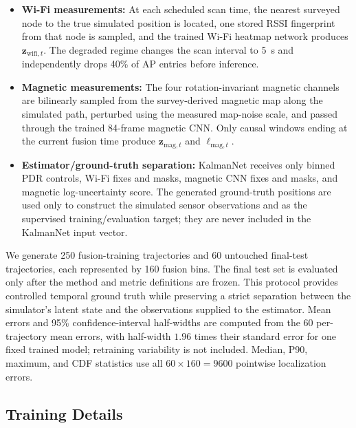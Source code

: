 \documentclass[conference]{IEEEtran}
\begin{document}
\begin{itemize}
    \item \textbf{Wi-Fi measurements:} At each scheduled scan time, the nearest surveyed node to the true simulated position is located, one stored RSSI fingerprint from that node is sampled, and the trained Wi-Fi heatmap network produces $\mathbf{z}_{\mathrm{wifi},t}$. The degraded regime changes the scan interval to 5~s and independently drops 40\% of AP entries before inference.
    \item \textbf{Magnetic measurements:} The four rotation-invariant magnetic channels are bilinearly sampled from the survey-derived magnetic map along the simulated path, perturbed using the measured map-noise scale, and passed through the trained 84-frame magnetic CNN. Only causal windows ending at the current fusion time produce $\mathbf{z}_{\mathrm{mag},t}$ and $\ell_{\mathrm{mag},t}$.
    \item \textbf{Estimator/ground-truth separation:} KalmanNet receives only binned PDR controls, Wi-Fi fixes and masks, magnetic CNN fixes and masks, and magnetic log-uncertainty score. The generated ground-truth positions are used only to construct the simulated sensor observations and as the supervised training/evaluation target; they are never included in the KalmanNet input vector.
\end{itemize}

We generate 250 fusion-training trajectories and 60 untouched final-test trajectories, each represented by 160 fusion bins. The final test set is evaluated only after the method and metric definitions are frozen. This protocol provides controlled temporal ground truth while preserving a strict separation between the simulator's latent state and the observations supplied to the estimator. Mean errors and 95\% confidence-interval half-widths are computed from the 60 per-trajectory mean errors, with half-width $1.96$ times their standard error for one fixed trained model; retraining variability is not included. Median, P90, maximum, and CDF statistics use all $60\times160=9600$ pointwise localization errors.

\subsection{Training Details}
\end{document}
